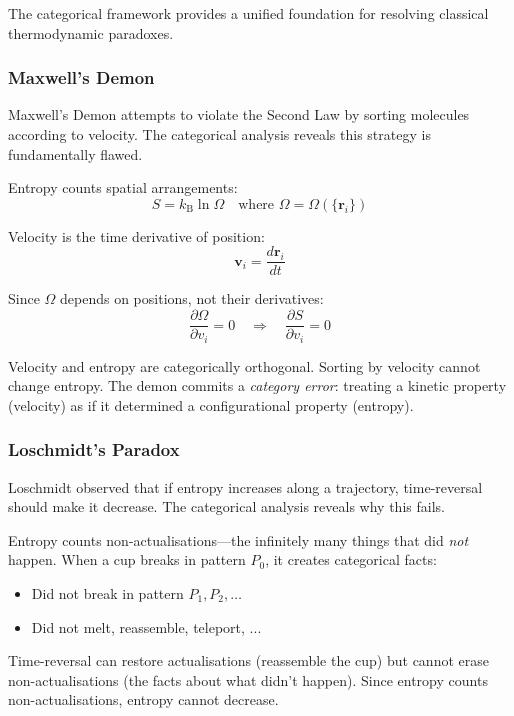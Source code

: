 \documentclass[twocolumn,10pt]{article}
\theoremstyle{definition}
\theoremstyle{remark}
\newcommand{\kB}{k_{\mathrm{B}}}
\begin{document}
The categorical framework provides a unified foundation for resolving classical thermodynamic paradoxes.

\subsubsection{Maxwell's Demon}

Maxwell's Demon attempts to violate the Second Law by sorting molecules according to velocity. The categorical analysis reveals this strategy is fundamentally flawed.

Entropy counts spatial arrangements:
\begin{equation}
S = \kB \ln \Omega \quad \text{where } \Omega = \Omega(\{\mathbf{r}_i\})
\end{equation}

Velocity is the time derivative of position:
\begin{equation}
\mathbf{v}_i = \frac{d\mathbf{r}_i}{dt}
\end{equation}

Since $\Omega$ depends on positions, not their derivatives:
\begin{equation}
\frac{\partial \Omega}{\partial v_i} = 0 \quad \Rightarrow \quad \frac{\partial S}{\partial v_i} = 0
\end{equation}

Velocity and entropy are categorically orthogonal. Sorting by velocity cannot change entropy. The demon commits a \textit{category error}: treating a kinetic property (velocity) as if it determined a configurational property (entropy).

\subsubsection{Loschmidt's Paradox}

Loschmidt observed that if entropy increases along a trajectory, time-reversal should make it decrease. The categorical analysis reveals why this fails.

Entropy counts non-actualisations---the infinitely many things that did \textit{not} happen. When a cup breaks in pattern $P_0$, it creates categorical facts:
\begin{itemize}
\item Did not break in pattern $P_1, P_2, \ldots$
\item Did not melt, reassemble, teleport, ...
\end{itemize}

Time-reversal can restore actualisations (reassemble the cup) but cannot erase non-actualisations (the facts about what didn't happen). Since entropy counts non-actualisations, entropy cannot decrease.
\end{document}
